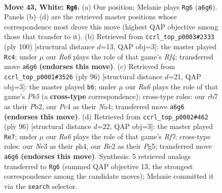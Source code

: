 \documentclass[11pt]{article}
\begin{document}
\clearpage

\begin{figure}[p]\centering
\begin{subfigure}{0.46\textwidth}\centering
\resizebox{\linewidth}{!}{%
\newchessgame
\chessboard[
  setfen={6k1/1r4b1/R7/8/2P5/4N2K/4R3/8 w - - 6 43},
  showmover=false,
  pgfstyle=straightmove, color=movearrow, markmove={a6-g6}
]}
\caption{}
\end{subfigure}\hfill
\begin{subfigure}{0.46\textwidth}\centering
\resizebox{\linewidth}{!}{%
\newchessgame
\chessboard[
  setfen={8/8/2k5/2b1r3/5R2/3K1P2/8/8 w - - 0 51},
  showmover=false,
  pgfstyle=straightmove, color=movearrow, markmove={f4-c4}
]}
\caption{}
\end{subfigure}
\\[4pt]
\begin{subfigure}{0.46\textwidth}\centering
\resizebox{\linewidth}{!}{%
\newchessgame
\chessboard[
  setfen={8/8/3k4/1P1b4/N4K2/8/1P6/8 w - - 2 49},
  showmover=false,
  pgfstyle=straightmove, color=movearrow, markmove={b5-b6}
]}
\caption{}
\end{subfigure}\hfill
\begin{subfigure}{0.46\textwidth}\centering
\resizebox{\linewidth}{!}{%
\newchessgame
\chessboard[
  setfen={8/5R2/8/6P1/4b2p/2K1k3/8/8 w - - 3 49},
  showmover=false,
  pgfstyle=straightmove, color=movearrow, markmove={f7-e7}
]}
\caption{}
\end{subfigure}
\caption{\textbf{Move 43, White: \texttt{Rg6}.} (a) Our position; Melanie plays \texttt{Rg6} (\texttt{a6g6}). Panels (b)--(d) are the retrieved master positions whose correspondence most drove this move (highest QAP objective among those that transfer to it). (b) Retrieved from \texttt{ccrl\_top\_p0003\#2333} (ply 100) [structural distance $d$=13, QAP obj=3]: the master played \texttt{Rc4}; under $\mu$ our \emph{Ra6} plays the role of that game's \emph{Rf4}; transferred move \texttt{a6g6} \textbf{(endorses this move)}. (c) Retrieved from \texttt{ccrl\_top\_p0001\#3526} (ply 96) [structural distance $d$=21, QAP obj=3]: the master played \texttt{b6}; under $\mu$ our \emph{Ra6} plays the role of that game's \emph{Pb5} (a \textbf{cross-type} correspondence); cross-type roles: our \emph{r}b7 as their \emph{P}b2, our \emph{P}c4 as their \emph{N}a4; transferred move \texttt{a6g6} \textbf{(endorses this move)}. (d) Retrieved from \texttt{ccrl\_top\_p0002\#462} (ply 96) [structural distance $d$=22, QAP obj=3]: the master played \texttt{Re7}; under $\mu$ our \emph{Ra6} plays the role of that game's \emph{Rf7}; cross-type roles: our \emph{N}e3 as their \emph{p}h4, our \emph{R}e2 as their \emph{P}g5; transferred move \texttt{a6g6} \textbf{(endorses this move)}. Synthesis: 5 retrieved analogs transferred to \texttt{Rg6} (summed QAP objective 13, the strongest correspondence among the candidate moves); Melanie committed it via the \texttt{search} selector.}
\label{fig:thought-m84}
\end{figure}
\end{document}
